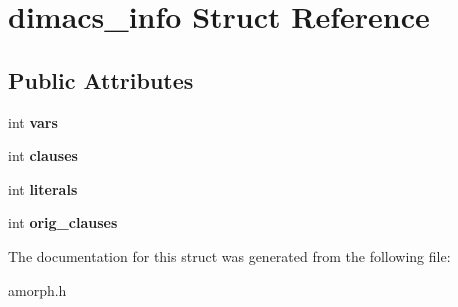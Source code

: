 \hypertarget{structdimacs__info}{\section{dimacs\-\_\-info Struct Reference}
\label{structdimacs__info}
}
\subsection*{Public Attributes}
\begin{DoxyCompactItemize}
\item 
\hypertarget{structdimacs__info_aa96f5562e96fd35a0355109e82c933b0}{int {\bfseries vars}}\label{structdimacs__info_aa96f5562e96fd35a0355109e82c933b0}

\item 
\hypertarget{structdimacs__info_a94b4e30cc8b8f5564a4c9571250e2869}{int {\bfseries clauses}}\label{structdimacs__info_a94b4e30cc8b8f5564a4c9571250e2869}

\item 
\hypertarget{structdimacs__info_a1a5cebfb74d127f7a29e71a7d2ca8c54}{int {\bfseries literals}}\label{structdimacs__info_a1a5cebfb74d127f7a29e71a7d2ca8c54}

\item 
\hypertarget{structdimacs__info_a6144880acb1e50beaa6cfb8cf9e52e3d}{int {\bfseries orig\-\_\-clauses}}\label{structdimacs__info_a6144880acb1e50beaa6cfb8cf9e52e3d}

\end{DoxyCompactItemize}


The documentation for this struct was generated from the following file\-:\begin{DoxyCompactItemize}
\item 
amorph.\-h\end{DoxyCompactItemize}
